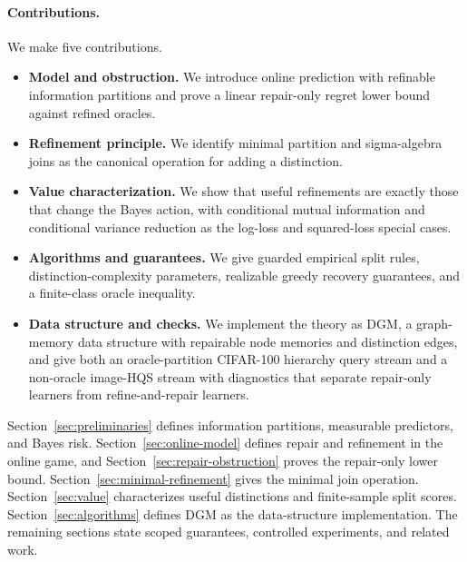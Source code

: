 \paragraph{Contributions.}
We make five contributions.
\begin{itemize}
    \item \textbf{Model and obstruction.} We introduce online prediction with refinable information partitions and prove a linear repair-only regret lower bound against refined oracles.
    \item \textbf{Refinement principle.} We identify minimal partition and sigma-algebra joins as the canonical operation for adding a distinction.
    \item \textbf{Value characterization.} We show that useful refinements are exactly those that change the Bayes action, with conditional mutual information and conditional variance reduction as the log-loss and squared-loss special cases.
    \item \textbf{Algorithms and guarantees.} We give guarded empirical split rules, distinction-complexity parameters, realizable greedy recovery guarantees, and a finite-class oracle inequality.
    \item \textbf{Data structure and checks.} We implement the theory as DGM, a graph-memory data structure with repairable node memories and distinction edges, and give both an oracle-partition CIFAR-100 hierarchy query stream and a non-oracle image-HQS stream with diagnostics that separate repair-only learners from refine-and-repair learners.
\end{itemize}

Section~\ref{sec:preliminaries} defines information partitions, measurable predictors, and Bayes risk. Section~\ref{sec:online-model} defines repair and refinement in the online game, and Section~\ref{sec:repair-obstruction} proves the repair-only lower bound. Section~\ref{sec:minimal-refinement} gives the minimal join operation. Section~\ref{sec:value} characterizes useful distinctions and finite-sample split scores. Section~\ref{sec:algorithms} defines DGM as the data-structure implementation. The remaining sections state scoped guarantees, controlled experiments, and related work.
